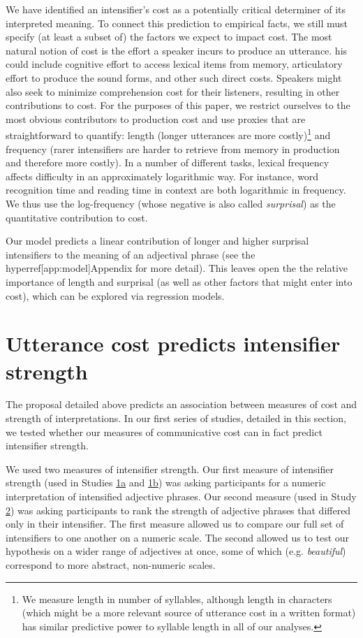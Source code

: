 \documentclass[10pt,letterpaper]{article}
\newcommand{\w}[1]{\emph{#1}}
\begin{document}
We have identified an intensifier's cost as a potentially critical determiner of its interpreted meaning.
To connect this prediction to empirical facts, we still must specify (at least a subset of) the factors we expect to impact cost.
The most natural notion of cost is the effort a speaker incurs to produce an utterance. 
his could include cognitive effort to access lexical items from memory, articulatory effort to produce  the sound forms, and other such direct costs.
Speakers might also seek to minimize comprehension cost for their listeners, resulting in other contributions to cost. 
For the purposes of this paper, we restrict ourselves to the most obvious contributors to production cost and use proxies that are straightforward to quantify: length (longer utterances are more costly)\footnote{
  We measure length in number of syllables, although length in characters (which might be a more relevant source of utterance cost in a written format) has similar predictive power to syllable length in all of our analyses.
}
and frequency (rarer intensifiers are harder to retrieve from memory in production and therefore more costly).
In a number of different tasks, lexical frequency affects difficulty in an approximately logarithmic way.
For instance, word recognition time \cite{mccusker_determinants_1977} and reading time in context \cite{smith_effect_2013} are both logarithmic in frequency.
We thus use the log-frequency (whose negative is also called \emph{surprisal}) as the quantitative contribution to cost.

Our model predicts a linear contribution of longer and higher surprisal intensifiers to the meaning of an adjectival phrase (see the hyperref[app:model]{Appendix} for more detail). 
This leaves open the the relative importance of length and surprisal (as well as other factors that might enter into cost), which can be explored via regression models.

\section{Utterance cost predicts intensifier strength}

The proposal detailed above predicts an association between measures of cost and strength of interpretations.
In our first series of studies, detailed in this section, we tested whether our measures of communicative cost can in fact predict intensifier strength.

We used two measures of intensifier strength.
Our first measure of intensifier strength (used in Studies \hyperref[sec:study1a]{1a} and \hyperref[sec:study1b]{1b}) was asking participants for a numeric interpretation of intensified adjective phrases.
Our second measure (used in Study \hyperref[sec:study2]{2}) was asking participants to rank the strength of adjective phrases that differed only in their intensifier.
The first measure allowed us to compare our full set of intensifiers to one another on a numeric scale.
The second allowed us to test our hypothesis on a wider range of adjectives at once, some of which (e.g. \w{beautiful}) correspond to more abstract, non-numeric scales.
\end{document}

